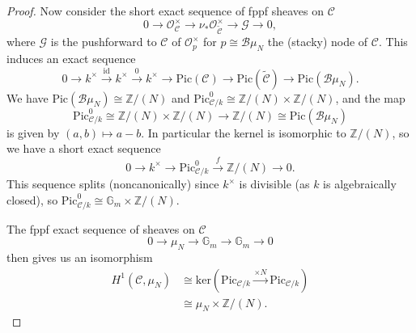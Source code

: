 \documentclass[11pt]{amsart}
\theoremstyle{definition}
\begin{document}
\begin{proof}
Now consider the short exact sequence of fppf sheaves on ${\mathcal{C}}$ 
\begin{displaymath}
0 \rightarrow {\mathcal{O}}^\times_{\mathcal{C}} \rightarrow \nu_* {\mathcal{O}}^\times_{\widetilde{\mathcal{C}}} \rightarrow {\mathcal{G}} \rightarrow 0,
\end{displaymath}
where ${\mathcal{G}}$ is the pushforward to ${\mathcal{C}}$ of ${\mathcal{O}}^\times_p$ for $p \cong {\mathcal{B}}\mu_N$ the (stacky) node of ${\mathcal{C}}$. This induces an exact sequence 
\begin{displaymath}
0 \rightarrow k^\times \stackrel{\mathrm{id}}{\rightarrow} k^\times \stackrel{0}{\rightarrow} k^\times \rightarrow \mathrm{Pic}({\mathcal{C}}) \rightarrow \mathrm{Pic}(\widetilde{\mathcal{C}}) \rightarrow \mathrm{Pic}({\mathcal{B}}\mu_N).
\end{displaymath}
We have $\mathrm{Pic}({\mathcal{B}}\mu_N) \cong \mathbb{Z}/(N)$ and $\mathrm{Pic}^0_{{\mathcal{C}}/k} \cong \mathbb{Z}/(N) \times \mathbb{Z}/(N)$, and the map 
\begin{displaymath}
\mathrm{Pic}^0_{{\mathcal{C}}/k} \cong \mathbb{Z}/(N) \times \mathbb{Z}/(N) \rightarrow \mathbb{Z}/(N) \cong \mathrm{Pic}({\mathcal{B}}\mu_N)
\end{displaymath}
is given by $(a,b) \mapsto a-b$. In particular the kernel is isomorphic to $\mathbb{Z}/(N)$, so we have a short exact sequence 
\begin{displaymath}
0 \rightarrow k^\times \rightarrow \mathrm{Pic}^0_{{\mathcal{C}}/k} \stackrel{f}{\rightarrow} \mathbb{Z}/(N) \rightarrow 0.
\end{displaymath}
This sequence splits (noncanonically) since $k^\times$ is divisible (as $k$ is algebraically closed), so $\mathrm{Pic}^0_{{\mathcal{C}}/k} \cong \mathbb{G}_m \times \mathbb{Z}/(N)$.

The fppf exact sequence of sheaves on ${\mathcal{C}}$ 
\begin{displaymath}
0 \rightarrow \mu_N \rightarrow \mathbb{G}_m \rightarrow \mathbb{G}_m \rightarrow 0
\end{displaymath}
then gives us an isomorphism 
\begin{align*}
H^1 ({\mathcal{C}}, \mu_N) & \cong \mathrm{ker}(\mathrm{Pic}_{{\mathcal{C}}/k} \stackrel{\times N}{\longrightarrow} \mathrm{Pic}_{{\mathcal{C}}/k}) \\
& \cong \mu_N \times \mathbb{Z}/(N).
\end{align*}


\end{proof}
\end{document}
